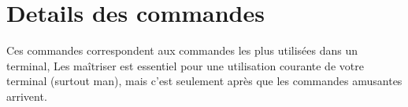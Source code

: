 \documentclass[french, a4paper, 12pt, titlepage]{article}
\begin{document}
\section{Details des commandes}








\vspace{7em}

Ces commandes correspondent aux commandes les plus utilisées dans un terminal,
Les maîtriser est essentiel pour une utilisation courante de votre terminal (surtout man), mais c'est seulement après que les commandes amusantes arrivent.

\newpage
\end{document}
